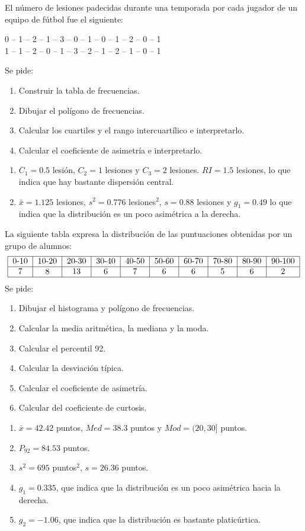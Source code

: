 {El número de lesiones padecidas durante una temporada por cada jugador de un equipo de fútbol fue el siguiente:
\begin{center}
0 -- 1 -- 2 -- 1 -- 3 -- 0 -- 1 -- 0 -- 1 -- 2 -- 0 -- 1 \\
1 -- 1 -- 2 -- 0 -- 1 -- 3 -- 2 -- 1 -- 2 -- 1 -- 0 -- 1
\end{center}
Se pide:
\begin{enumerate}
\item Construir la tabla de frecuencias.
\item Dibujar el polígono de frecuencias.
\item Calcular los cuartiles y el rango intercuartílico e interpretarlo.
\item Calcular el coeficiente de asimetría e interpretarlo.
\end{enumerate}
}
{\begin{enumerate}[start=3]
\item $C_1 = 0.5$ lesión, $C_2=1$ lesiones y $C_3=2$ lesiones. $RI=1.5$ lesiones, lo que indica que hay bastante dispersión central.
\item $\bar{x}= 1.125$ lesiones, $s^2= 0.776$ lesiones$^2$, $s= 0.88$ lesiones y $g_1=0.49$ lo que indica que la distribución es un poco asimétrica a la derecha.
\end{enumerate}
}
{}


{La siguiente tabla expresa la distribución de las puntuaciones obtenidas por un grupo de alumnos:
\[
\begin{tabular}{|c|c|c|c|c|c|c|c|c|c|}
\hline
0-10 & 10-20 & 20-30 & 30-40 & 40-50 & 50-60 & 60-70 & 70-80 & 80-90 & 90-100
\\ \hline
7 & 8 & 13 & 6 & 7 & 6 & 6 & 5 & 6 & 2 \\ \hline
\end{tabular}
\]
Se pide:
\begin{enumerate}
\item  Dibujar el histograma y polígono de frecuencias.
\item  Calcular la media aritmética, la mediana y la moda.
\item  Calcular el percentil 92.
\item  Calcular la desviación típica.
\item  Calcular el coeficiente de asimetría.
\item  Calcular del coeficiente de curtosis.
\end{enumerate}
}
{
\begin{enumerate}[start=2]
\item $ \bar{x} = 42.42$ puntos, $Med =38.3$ puntos y $Mod= (20,30]$ puntos.
\item $P_{92}=84.53$ puntos.
\item $s^2 = 695$ puntos$^2$, $s= 26.36$ puntos.
\item $g_1 = 0.335$, que indica que la distribución es un poco asimétrica hacia la derecha.
\item $g_2 = -1.06$, que indica que la distribución es bastante platicúrtica.
\end{enumerate}
}
{}


